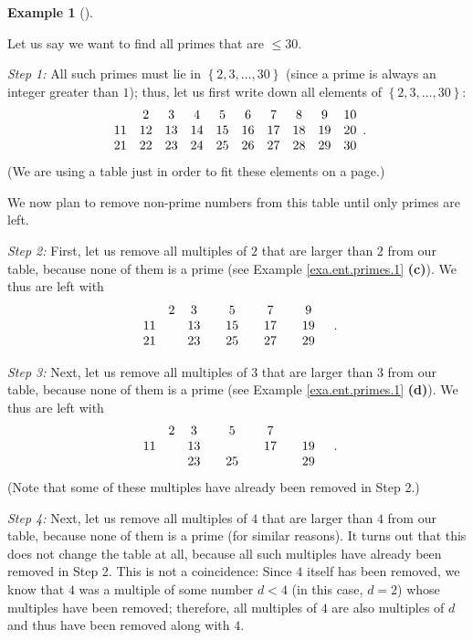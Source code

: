 \documentclass[numbers=enddot,12pt,final,onecolumn,notitlepage]{scrartcl}%
\numberwithin{exer}{subsection}
\theoremstyle{definition}
\newtheorem{exam}[theo]{Example}
\newenvironment{example}[1][]
{\begin{exam}[#1]\begin{leftbar}}
{\end{leftbar}\end{exam}}
\begin{document}
\begin{example}
Let us say we want to find all primes that are $\leq30$.

\textit{Step 1:} All such primes must lie in $\left\{  2,3,\ldots,30\right\}
$ (since a prime is always an integer greater than $1$); thus, let us first
write down all elements of $\left\{  2,3,\ldots,30\right\}  $:%
\[%
\begin{array}
[c]{cccccccccc}
& 2 & 3 & 4 & 5 & 6 & 7 & 8 & 9 & 10\\
11 & 12 & 13 & 14 & 15 & 16 & 17 & 18 & 19 & 20\\
21 & 22 & 23 & 24 & 25 & 26 & 27 & 28 & 29 & 30
\end{array}
.
\]
(We are using a table just in order to fit these elements on a page.)

We now plan to remove non-prime numbers from this table until only primes are left.

\textit{Step 2:} First, let us remove all multiples of $2$ that are larger
than $2$ from our table, because none of them is a prime (see Example
\ref{exa.ent.primes.1} \textbf{(c)}). We thus are left with%
\[%
\begin{array}
[c]{cccccccccc}
& 2 & 3 &  & 5 &  & 7 &  & 9 & \\
11 &  & 13 &  & 15 &  & 17 &  & 19 & \\
21 &  & 23 &  & 25 &  & 27 &  & 29 &
\end{array}
.
\]


\textit{Step 3:} Next, let us remove all multiples of $3$ that are larger than
$3$ from our table, because none of them is a prime (see Example
\ref{exa.ent.primes.1} \textbf{(d)}). We thus are left with%
\[%
\begin{array}
[c]{cccccccccc}
& 2 & 3 &  & 5 &  & 7 &  &  & \\
11 &  & 13 &  &  &  & 17 &  & 19 & \\
&  & 23 &  & 25 &  &  &  & 29 &
\end{array}
.
\]
(Note that some of these multiples have already been removed in Step 2.)

\textit{Step 4:} Next, let us remove all multiples of $4$ that are larger than
$4$ from our table, because none of them is a prime (for similar reasons). It
turns out that this does not change the table at all, because all such
multiples have already been removed in Step 2. This is not a coincidence:
Since $4$ itself has been removed, we know that $4$ was a multiple of some
number $d<4$ (in this case, $d=2$) whose multiples have been removed;
therefore, all multiples of $4$ are also multiples of $d$ and thus have been
removed along with $4$.


\end{example}
\end{document}
